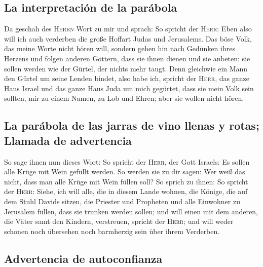 \hypertarget{la-interpretaciuxf3n-de-la-paruxe1bola}{%
\subsection{La interpretación de la
parábola}\label{la-interpretaciuxf3n-de-la-paruxe1bola}}

 Da geschah des \textsc{Herrn} Wort zu mir und sprach:
 So spricht der \textsc{Herr}: Eben also will ich auch
verderben die große Hoffart Judas und Jerusalems.  Das
böse Volk, das meine Worte nicht hören will, sondern gehen hin nach
Gedünken ihres Herzens und folgen anderen Göttern, dass sie ihnen dienen
und sie anbeten: sie sollen werden wie der Gürtel, der nichts mehr
taugt.  Denn gleichwie ein Mann den Gürtel um seine
Lenden bindet, also habe ich, spricht der \textsc{Herr}, das ganze Haus
Israel und das ganze Haus Juda um mich gegürtet, dass sie mein Volk sein
sollten, mir zu einem Namen, zu Lob und Ehren; aber sie wollen nicht
hören.

\hypertarget{la-paruxe1bola-de-las-jarras-de-vino-llenas-y-rotas-llamada-de-advertencia}{%
\subsection{La parábola de las jarras de vino llenas y rotas; Llamada de
advertencia}\label{la-paruxe1bola-de-las-jarras-de-vino-llenas-y-rotas-llamada-de-advertencia}}

 So sage ihnen nun dieses Wort: So spricht der
\textsc{Herr}, der Gott Israels: Es sollen alle Krüge mit Wein gefüllt
werden. So werden sie zu dir sagen: Wer weiß das nicht, dass man alle
Krüge mit Wein füllen soll?  So sprich zu ihnen: So
spricht der \textsc{Herr}: Siehe, ich will alle, die in diesem Lande
wohnen, die Könige, die auf dem Stuhl Davids sitzen, die Priester und
Propheten und alle Einwohner zu Jerusalem füllen, dass sie trunken
werden sollen;  und will einen mit dem anderen, die Väter
samt den Kindern, verstreuen, spricht der \textsc{Herr}; und will weder
schonen noch übersehen noch barmherzig sein über ihrem Verderben.

\hypertarget{advertencia-de-autoconfianza}{%
\subsection{Advertencia de
autoconfianza}\label{advertencia-de-autoconfianza}}


